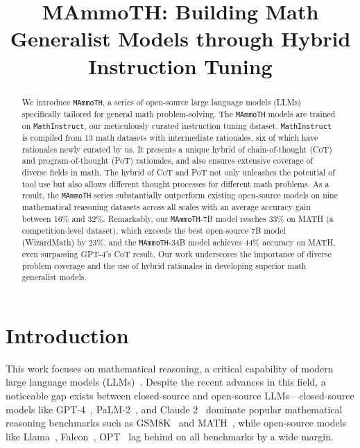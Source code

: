 \title{MAmmoTH: Building Math Generalist Models through Hybrid Instruction Tuning}

\begin{abstract}
We introduce \texttt{MAmmoTH},  a series of open-source large language models (LLMs) specifically tailored for general math problem-solving. The \texttt{MAmmoTH} models are trained on \texttt{MathInstruct}, our meticulously curated instruction tuning dataset. \texttt{MathInstruct} is compiled from 13 math datasets with intermediate rationales, six of which have rationales newly curated by us. It presents a unique hybrid of chain-of-thought (CoT) and program-of-thought (PoT) rationales, and also ensures extensive coverage of diverse fields in math. The hybrid of CoT and PoT not only unleashes the potential of tool use but also allows different thought processes for different math problems.  As a result, the \texttt{MAmmoTH} series substantially outperform existing open-source models on nine mathematical reasoning datasets across all scales with an average accuracy gain between 16\% and 32\%. Remarkably, our \texttt{MAmmoTH}-7B model reaches 33\% on MATH (a competition-level dataset), which exceeds the best open-source 7B model (WizardMath) by 23\%, and the \texttt{MAmmoTH}-34B model achieves 44\% accuracy on MATH, even surpassing GPT-4's CoT result. Our work underscores the importance of diverse problem coverage and the use of hybrid rationales in developing superior math generalist models.
\end{abstract}

\section{Introduction}
This work focuses on mathematical reasoning, a critical capability of modern large language models (LLMs)~\citep{OpenAI2023GPT4TR,anil2023palm}. Despite the recent advances in this field, a noticeable gap exists between closed-source and open-source LLMs---closed-source models like GPT-4~\citep{OpenAI2023GPT4TR}, PaLM-2~\citep{anil2023palm}, and Claude 2~\citep{bai2022constitutional} dominate popular mathematical reasoning benchmarks such as GSM8K~\citep{cobbe2021training} and MATH~\citep{hendrycks2021measuring}, while open-source models like Llama~\citep{touvron2023llama1,touvron2023llama2}, Falcon~\citep{penedo2023refinedweb}, OPT~\citep{zhang2022opt} lag behind on all benchmarks by a wide margin.

